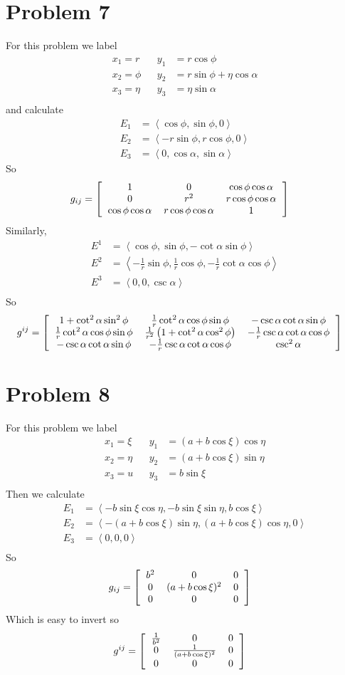 \documentclass[12pt]{article}
\newcommand{\eq}[1]{\begin{align*}#1\end{align*}}
\newcommand{\mat}[2]{\left[\begin{tabular}{#1}#2\end{tabular}\right]}
\begin{document}
\section*{Problem 7}
For this problem we label
\eq{
	x_1 = r && y_1 &= r\cos\phi\\
	x_2 = \phi && y_2 &= r\sin\phi + \eta\cos\alpha\\
	x_3 = \eta && y_3 &= \eta\sin\alpha\\
}
and calculate
\eq{
	E_1 &= \left<\cos\phi, \sin\phi, 0 \right>\\
	E_2 &= \left<-r\sin\phi, r\cos\phi, 0\right>\\
	E_3 &= \left<0, \cos\alpha, \sin\alpha\right>
}
So
\eq{
	g_{ij} &= \mat{ccc}{
		1 & 0 & $\cos\phi\cos\alpha$\\
		0 & $r^2$ & $r\cos\phi\cos\alpha$\\
		$\cos\phi\cos\alpha$ & $r\cos\phi\cos\alpha$ & 1\\
	}
}
Similarly,
\eq{
	E^1 &= \left<\cos\phi, \sin\phi, -\cot\alpha\sin\phi \right> \\
	E^2 &= \left<-\frac{1}{r}\sin\phi, \frac{1}{r}\cos\phi, -\frac{1}{r}\cot\alpha\cos\phi \right>\\
	E^3 &= \left<0, 0, \csc\alpha \right> \\
}
So
\eq{
	g^{ij} &= \mat{ccc}{
		$1 + \cot^2\alpha\sin^2\phi$ & $\frac{1}{r}\cot^2\alpha\cos\phi\sin\phi$ & $-\csc\alpha\cot\alpha\sin\phi$ \\
		$\frac{1}{r}\cot^2\alpha\cos\phi\sin\phi$ & $\frac{1}{r^2}\left(1 + \cot^2\alpha\cos^2\phi\right)$ & $-\frac{1}{r}\csc\alpha\cot\alpha\cos\phi$ \\
		$-\csc\alpha\cot\alpha\sin\phi$ & $-\frac{1}{r}\csc\alpha\cot\alpha\cos\phi$ & $\csc^2\alpha$\\
	}
}
\section*{Problem 8}
For this problem we label
\eq{
	x_1 = \xi && y_1 &= (a + b\cos\xi)\cos\eta\\
	x_2 = \eta && y_2 &= (a + b\cos\xi)\sin\eta\\
	x_3 = u && y_3 &= b\sin\xi\\
}
Then we calculate
\eq{
	E_1 &= \left< -b\sin\xi\cos\eta, -b\sin\xi\sin\eta, b\cos\xi \right >\\
	E_2 &= \left< -(a+b\cos\xi)\sin\eta, (a+b\cos\xi)\cos\eta, 0 \right>\\
	E_3 &= \left< 0, 0, 0\right >\\
}
So
\eq{
	g_{ij} &= \mat{ccc}{
		$b^2$ & 0 & 0 \\
		0 & $(a + b\cos\xi)^2$ & 0 \\
		0 & 0 & 0\\
	}
}
Which is easy to invert so
\eq{
	g^{ij} &= \mat{ccc}{
		$\frac{1}{b^2}$ & 0 & 0 \\
		0 & $\frac{1}{(a + b\cos\xi)^2}$ & 0\\
		0 & 0 & 0\\
	}
}
\end{document}
